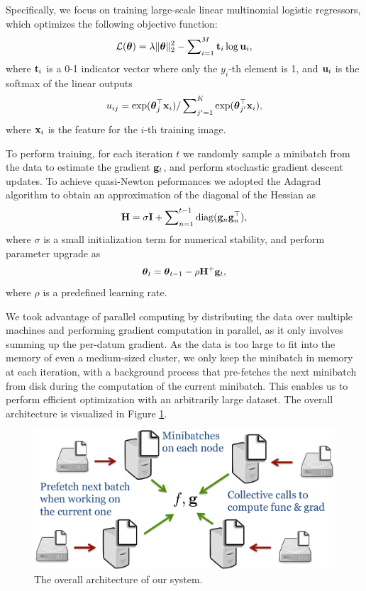 Specifically, we focus on training large-scale linear multinomial logistic regressors, which optimizes the following objective function:
\begin{equation}\label{eqn:loss}
    \mathcal{L}(\boldsymbol{\theta}) = \lambda \|\boldsymbol{\theta}\|_2^2 - \sum\nolimits_{i=1}^{M}\mathbf{t}_i \log \mathbf{u}_{i},
\end{equation}
where $\mathbf{t}_i$ is a 0-1 indicator vector where only the $y_i$-th element is 1, and $\mathbf{u}_i$ is the softmax of the linear outputs
\begin{equation}
    u_{ij} = \exp(\boldsymbol{\theta}_j^\top\mathbf{x}_i) / \sum\nolimits_{j'=1}^{K}\exp(\boldsymbol{\theta}_{j'}^\top\mathbf{x}_i),
\end{equation}
where $\mathbf{x}_i$ is the feature for the $i$-th training image.

To perform training, for each iteration $t$ we randomly sample a minibatch from the data to estimate the gradient $\mathbf{g}_t$, and perform stochastic gradient descent updates. To achieve quasi-Newton peformances we adopted the Adagrad \cite{duchi2010adaptive} algorithm to obtain an approximation of the diagonal of the Hessian as
\begin{equation}
\mathbf{H} = \sigma\mathbf{I} + \sum\nolimits_{n=1}^{t-1}\mathrm{diag}(\mathbf{g}_{n}\mathbf{g}_{n}^\top) ,
\end{equation}
where $\sigma$ is a small initialization term for numerical stability, and perform parameter upgrade as
\begin{equation}
\boldsymbol{\theta}_{t} = \boldsymbol{\theta}_{t-1} - \rho\mathbf{H}^{+}\mathbf{g}_t ,
\end{equation}
where $\rho$ is a predefined learning rate.

We took advantage of parallel computing by distributing the data over multiple machines and performing gradient computation in parallel, as it only involves summing up the per-datum gradient. As the data is too large to fit into the memory of even a medium-sized cluster, we only keep the minibatch in memory at each iteration, with a background process that pre-fetches the next minibatch from disk during the computation of the current minibatch. This enables us to perform efficient optimization with an arbitrarily large dataset. The overall architecture is visualized in Figure \ref{fig:architecture}.

\begin{figure}
  \centering
  \includegraphics[width=0.7\linewidth]{figs/taskadaptation/architecture.pdf}
  \caption{The overall architecture of our system.}\label{fig:architecture}
\end{figure}

